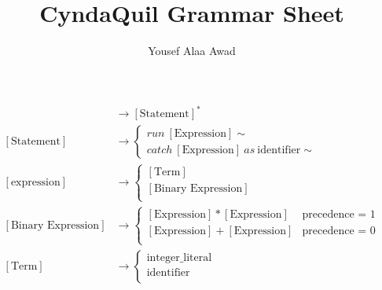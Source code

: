 \documentclass[12pt, letterpaper]{article}
\title{CyndaQuil Grammar Sheet}
\author{Yousef Alaa Awad}
\begin{document}
\maketitle
\begin{align}
  [\text{Program}] &\to [\text{Statement}]^* \\
  [\text{Statement}] &\to \begin{cases}
    run\ [\text{Expression}]\sim \\
    catch\  [\text{Expression}]\ as\ \text{identifier}\sim
  \end{cases} \\
  [\text{expression}]&\to \begin{cases}
    [\text{Term}] \\
    [\text{Binary Expression}] \\
  \end{cases} \\
  [\text{Binary Expression}] &\to \begin{cases}
    [\text{Expression}] * [\text{Expression}] & \text{precedence = 1}\\
    [\text{Expression}] + [\text{Expression}] &  \text{precedence = 0}\\
  \end{cases} \\
  [\text{Term}] &\to \begin{cases}
  \text{integer\_literal} \\
  \text{identifier} \\
  \end{cases}
\end{align}
\end{document}
